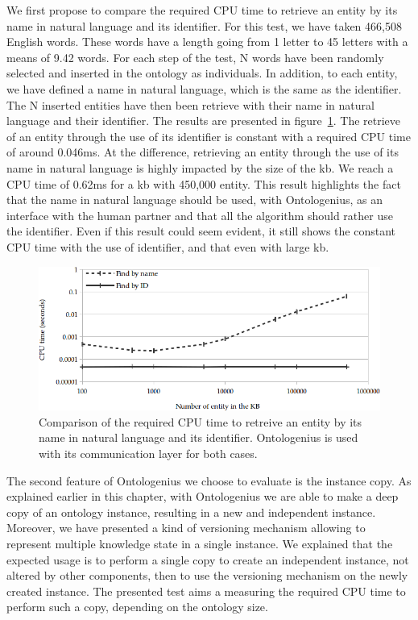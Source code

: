 We first propose to compare the required CPU time to retrieve an entity by its name in natural language and its identifier. For this test, we have taken 466,508 English words. These words have a length going from 1 letter to 45 letters with a means of  9.42 words. For each step of the test, N words have been randomly selected and inserted in the ontology as individuals. In addition, to each entity, we have defined a name in natural language, which is the same as the identifier. The N inserted entities have then been retrieve with their name in natural language and their identifier. The results are presented in figure~\ref{fig:chap2_extra_find}. The retrieve of an entity through the use of its identifier is constant with a required CPU time of around 0.046ms. At the difference, retrieving an entity through the use of its name in natural language is highly impacted by the size of the \acrshort{kb}. We reach a CPU time of 0.62ms for a \acrshort{kb} with 450,000 entity. This result highlights the fact that the name in natural language should be used, with Ontologenius, as an interface with the human partner and that all the algorithm should rather use the identifier. Even if this result could seem evident, it still shows the constant CPU time with the use of identifier, and that even with large \acrshort{kb}.

\begin{figure}[ht!]
\centering
\includegraphics[width=\textwidth]{figures/chapter2/extra_tests/find.png}
\caption{\label{fig:chap2_extra_find} Comparison of the required CPU time to retreive an entity by its name in natural language and its identifier. Ontologenius is used with its communication layer for both cases.}
\end{figure}

The second feature of Ontologenius we choose to evaluate is the instance copy. As explained earlier in this chapter, with Ontologenius we are able to make a deep copy of an ontology instance, resulting in a new and independent instance. Moreover, we have presented a kind of versioning mechanism allowing to represent multiple knowledge state in a single instance. We explained that the expected usage is to perform a single copy to create an independent instance, not altered by other components, then to use the versioning mechanism on the newly created instance. The presented test aims a measuring the required CPU time to perform such a copy, depending on the ontology size.

